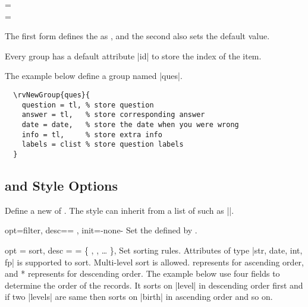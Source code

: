 \documentclass[full]{l3doc}
\begin{document}
\begin{documentation}
\begin{Syntax}
   =  \\
   = \textbar{}
\end{Syntax}

The first form defines the  as , and the second also
sets the default value.

\begin{note}
  Every group has a default attribute |id| to store the index of the item.
\end{note}

The example below define a group named |ques|.
\begin{verbatim}
  \rvNewGroup{ques}{
    question = tl, % store question
    answer = tl,   % store corresponding answer
    date = date,   % store the date when you were wrong
    info = tl,     % store extra info
    labels = clist % store question labels
  }
\end{verbatim}

\subsection{ and Style Options}

\begin{function}{\rvNewGroupStyle}
  \begin{syntax}
        
  \end{syntax}

Define a new  of . The style can inherit from a list
of  such as
||.
\end{function}

\bigskip

\begin{option}{opt=filter, desc={= }, init=-none-}
  Set the  defined by .
\end{option}

\begin{option}{
  opt = sort,
  desc = {= \{ , , \ldots{} \}},
}
  Set sorting rules. Attributes of type |str, date, int, fp| is supported to
  sort.  Multi-level sort is allowed.  represents for ascending
  order, and * represents for descending order. The example below
  use four fields to determine the order of the records. It sorts on |level|
  in descending order first and if two |levels| are same then sorts on |birth|
  in ascending order and so on.
\end{option}


\end{documentation}
\end{document}
